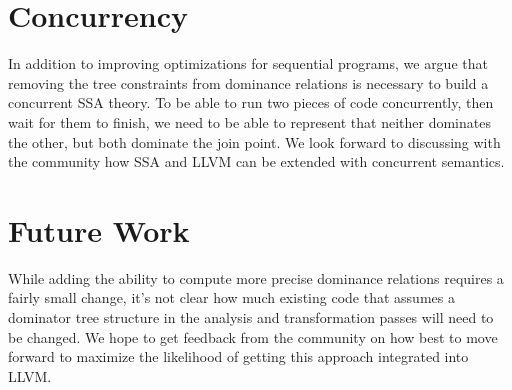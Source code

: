 \documentclass[a4paper,twocolumn]{article}
\begin{document}
\section*{Concurrency}
In addition to improving optimizations for sequential programs, we argue that 
removing the tree constraints from dominance relations is necessary to build a
concurrent SSA theory. To be able to run two pieces of code concurrently, then
wait for them to finish, we need to be able to represent that neither dominates
the other, but both dominate the join point. We look forward to discussing
with the community how SSA and LLVM can be extended with concurrent
semantics.

\section*{Future Work}
While adding the ability to compute more precise dominance relations requires
a fairly small change, it's not clear how much existing code that assumes a 
dominator tree structure in the analysis and transformation passes will need to be
changed. We hope to get feedback from the community on how best to move forward
to maximize the likelihood of getting this approach integrated into LLVM. 


\end{document}
